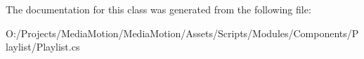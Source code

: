 The documentation for this class was generated from the following file\+:\begin{DoxyCompactItemize}
\item 
O\+:/\+Projects/\+Media\+Motion/\+Media\+Motion/\+Assets/\+Scripts/\+Modules/\+Components/\+Playlist/Playlist.\+cs\end{DoxyCompactItemize}
